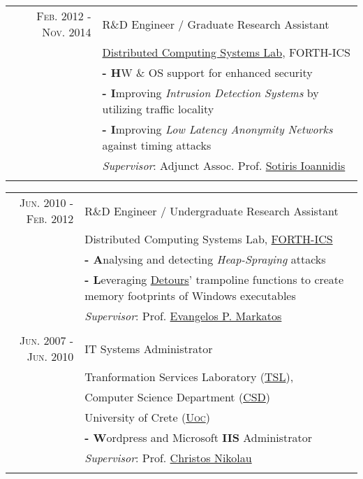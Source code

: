 \documentclass[a4paper,10pt]{article} %
\begin{document}
\begin{tabular}{r|p{}}
\textsc{Feb. 2012 - Nov. 2014} & {\large R\&D Engineer / Graduate Research Assistant} \\
& {\large \href{https://www.ics.forth.gr/dcs/}{Distributed Computing Systems Lab}, FORTH-ICS} \\
& \textbf{- H}W \& OS support for enhanced security \\
& \textbf{- I}mproving \emph{Intrusion Detection Systems} by utilizing traffic locality \\
& \textbf{- I}mproving \emph{Low Latency Anonymity Networks} against timing  attacks \\
& \emph{Supervisor}: Adjunct Assoc. Prof. \href{https://www.ics.forth.gr/discs/person/Ioannidis/\%CE\%A3\%CF\%89\%CF\%84\%CE\%AE\%CF\%81\%CE\%B9\%CE\%BF\%CF\%82}{Sotiris Ioannidis} \\
\multicolumn{2}{c}{} \\
\end{tabular}

\begin{tabular}{r|p{}}
\textsc{Jun. 2010 - Feb. 2012} & {\large R\&D Engineer / Undergraduate Research Assistant} \\
& {\large Distributed Computing Systems Lab, \href{https://www.ics.forth.gr/}{\textsc{FORTH-ICS}}} \\
& \textbf{- A}nalysing and detecting \emph{Heap-Spraying} attacks \\
& \textbf{- L}everaging \href{https://github.com/microsoft/detours/wiki}{Detours}' trampoline functions to create memory footprints of Windows executables \\
& \emph{Supervisor}: Prof. \href {https://www.ics.forth.gr/discs/person/Markatos/Evangelos\%20P.}{Evangelos P. Markatos} \\
\multicolumn{2}{c}{} \\

\textsc{Jun. 2007 - Jun. 2010} & {\large IT Systems Administrator} \\
& {\large Tranformation Services Laboratory (\href{http://www.tsl.gr/}{\textsc{TSL}}),} \\
& {\large Computer Science Department (\href{https://www.csd.uoc.gr/CSD/index.jsp?lang=en}{CSD})} \\
& {\large  University of Crete (\textsc{\href{http://www.uoc.gr/}{Uoc})}} \\
& \textbf{- W}ordpress and Microsoft \textbf{ IIS} Administrator \\
& \emph{Supervisor}: Prof. \href {https://scholar.google.com/citations?user=yyrCzBEAAAAJ}{Christos Nikolau} \\
\multicolumn{2}{c}{} \\

\end{tabular}
\end{document}
